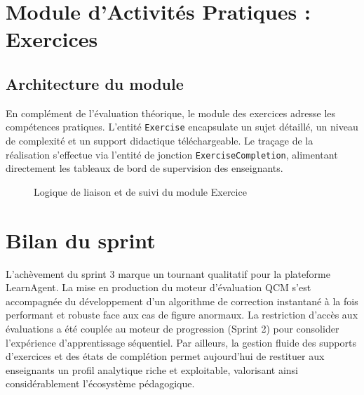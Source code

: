 \documentclass[12pt,a4paper]{report}
\begin{document}
\section{Module d'Activités Pratiques : Exercices}

\subsection{Architecture du module}

En complément de l'évaluation théorique, le module des exercices adresse les compétences pratiques. L'entité \texttt{Exercise} encapsulate un sujet détaillé, un niveau de complexité et un support didactique téléchargeable. Le traçage de la réalisation s'effectue via l'entité de jonction \texttt{ExerciseCompletion}, alimentant directement les tableaux de bord de supervision des enseignants.

\begin{figure}[H]
\centering
{}
\caption{Logique de liaison et de suivi du module Exercice}
\end{figure}

\section{Bilan du sprint}

L'achèvement du sprint 3 marque un tournant qualitatif pour la plateforme LearnAgent. La mise en production du moteur d'évaluation QCM s'est accompagnée du développement d'un algorithme de correction instantané à la fois performant et robuste face aux cas de figure anormaux. La restriction d'accès aux évaluations a été couplée au moteur de progression (Sprint 2) pour consolider l'expérience d'apprentissage séquentiel. Par ailleurs, la gestion fluide des supports d'exercices et des états de complétion permet aujourd'hui de restituer aux enseignants un profil analytique riche et exploitable, valorisant ainsi considérablement l'écosystème pédagogique.
\end{document}
